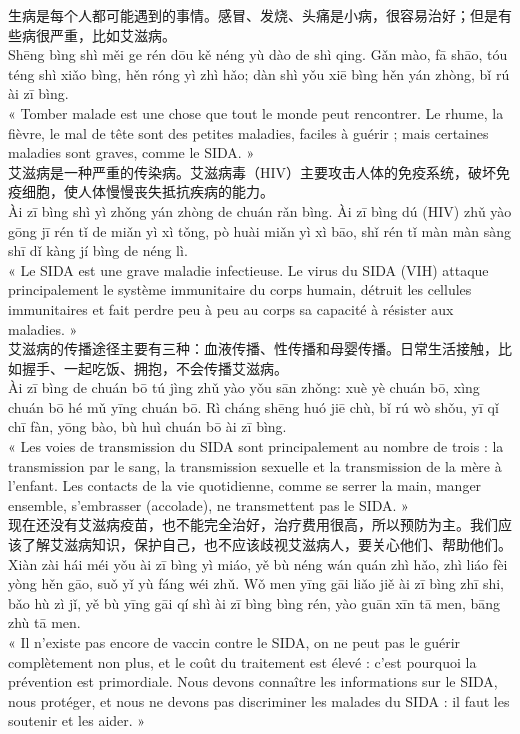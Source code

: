 \documentclass[11pt]{article}
\begin{document}
\begin{textebox}
生病是每个人都可能遇到的事情。感冒、发烧、头痛是小病，很容易治好；但是有些病很严重，比如艾滋病。\\
Shēng bìng shì měi ge rén dōu kě néng yù dào de shì qing. Gǎn mào, fā shāo, tóu téng shì xiǎo bìng, hěn róng yì zhì hǎo; dàn shì yǒu xiē bìng hěn yán zhòng, bǐ rú ài zī bìng.\\
« Tomber malade est une chose que tout le monde peut rencontrer. Le rhume, la fièvre, le mal de tête sont des petites maladies, faciles à guérir ; mais certaines maladies sont graves, comme le SIDA. »\\[4pt]
艾滋病是一种严重的传染病。艾滋病毒（HIV）主要攻击人体的免疫系统，破坏免疫细胞，使人体慢慢丧失抵抗疾病的能力。\\
Ài zī bìng shì yì zhǒng yán zhòng de chuán rǎn bìng. Ài zī bìng dú (HIV) zhǔ yào gōng jī rén tǐ de miǎn yì xì tǒng, pò huài miǎn yì xì bāo, shǐ rén tǐ màn màn sàng shī dǐ kàng jí bìng de néng lì.\\
« Le SIDA est une grave maladie infectieuse. Le virus du SIDA (VIH) attaque principalement le système immunitaire du corps humain, détruit les cellules immunitaires et fait perdre peu à peu au corps sa capacité à résister aux maladies. »\\[4pt]
艾滋病的传播途径主要有三种：血液传播、性传播和母婴传播。日常生活接触，比如握手、一起吃饭、拥抱，不会传播艾滋病。\\
Ài zī bìng de chuán bō tú jìng zhǔ yào yǒu sān zhǒng: xuè yè chuán bō, xìng chuán bō hé mǔ yīng chuán bō. Rì cháng shēng huó jiē chù, bǐ rú wò shǒu, yī qǐ chī fàn, yōng bào, bù huì chuán bō ài zī bìng.\\
« Les voies de transmission du SIDA sont principalement au nombre de trois : la transmission par le sang, la transmission sexuelle et la transmission de la mère à l'enfant. Les contacts de la vie quotidienne, comme se serrer la main, manger ensemble, s'embrasser (accolade), ne transmettent pas le SIDA. »\\[4pt]
现在还没有艾滋病疫苗，也不能完全治好，治疗费用很高，所以预防为主。我们应该了解艾滋病知识，保护自己，也不应该歧视艾滋病人，要关心他们、帮助他们。\\
Xiàn zài hái méi yǒu ài zī bìng yì miáo, yě bù néng wán quán zhì hǎo, zhì liáo fèi yòng hěn gāo, suǒ yǐ yù fáng wéi zhǔ. Wǒ men yīng gāi liǎo jiě ài zī bìng zhī shi, bǎo hù zì jǐ, yě bù yīng gāi qí shì ài zī bìng bìng rén, yào guān xīn tā men, bāng zhù tā men.\\
« Il n'existe pas encore de vaccin contre le SIDA, on ne peut pas le guérir complètement non plus, et le coût du traitement est élevé : c'est pourquoi la prévention est primordiale. Nous devons connaître les informations sur le SIDA, nous protéger, et nous ne devons pas discriminer les malades du SIDA : il faut les soutenir et les aider. »
\end{textebox}
\end{document}
